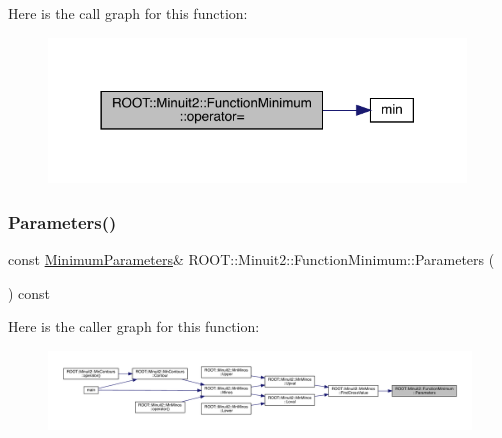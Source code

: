 Here is the call graph for this function\+:
\nopagebreak
\begin{figure}[H]
\begin{center}
\leavevmode
\includegraphics[width=314pt]{d4/dfb/classROOT_1_1Minuit2_1_1FunctionMinimum_a107909f1a994436795eb310f951f14cb_cgraph}
\end{center}
\end{figure}
\mbox{\label{classROOT_1_1Minuit2_1_1FunctionMinimum_a069ba097db08f87582b309330ef8aa6e}} 
\subsubsection{\texorpdfstring{Parameters()}{Parameters()}\hspace{0.1cm}{\footnotesize\ttfamily [1/3]}}
{\footnotesize\ttfamily const \mbox{\hyperlink{classROOT_1_1Minuit2_1_1MinimumParameters}{Minimum\+Parameters}}\& R\+O\+O\+T\+::\+Minuit2\+::\+Function\+Minimum\+::\+Parameters (\begin{DoxyParamCaption}{ }\end{DoxyParamCaption}) const\hspace{0.3cm}{\ttfamily [inline]}}

Here is the caller graph for this function\+:
\nopagebreak
\begin{figure}[H]
\begin{center}
\leavevmode
\includegraphics[width=350pt]{d4/dfb/classROOT_1_1Minuit2_1_1FunctionMinimum_a069ba097db08f87582b309330ef8aa6e_icgraph}
\end{center}
\end{figure}
\mbox{\label{classROOT_1_1Minuit2_1_1FunctionMinimum_a069ba097db08f87582b309330ef8aa6e}} 
